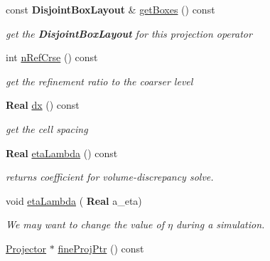 \begin{DoxyCompactItemize}
const \textbf{ Disjoint\+Box\+Layout} \& \hyperlink{class_projector_a139b4c4a107978be04259f436af16b65}{get\+Boxes} () const
\begin{DoxyCompactList}\small\item\em get the \textbf{ Disjoint\+Box\+Layout} for this projection operator \end{DoxyCompactList}\item 
\mbox{\label{class_projector_ad602a3f4c02994971e2bffd71cbb5ba0}} 
int \hyperlink{class_projector_ad602a3f4c02994971e2bffd71cbb5ba0}{n\+Ref\+Crse} () const
\begin{DoxyCompactList}\small\item\em get the refinement ratio to the coarser level \end{DoxyCompactList}\item 
\mbox{\label{class_projector_a84cae9538d1fb0cc3fca902a799d5e9d}} 
\textbf{ Real} \hyperlink{class_projector_a84cae9538d1fb0cc3fca902a799d5e9d}{dx} () const
\begin{DoxyCompactList}\small\item\em get the cell spacing \end{DoxyCompactList}\item 
\mbox{\label{class_projector_a3f98f84a909efe50397f1e58e21c3db9}} 
\textbf{ Real} \hyperlink{class_projector_a3f98f84a909efe50397f1e58e21c3db9}{eta\+Lambda} () const
\begin{DoxyCompactList}\small\item\em returns coefficient for volume-\/discrepancy solve. \end{DoxyCompactList}\item 
\mbox{\label{class_projector_ac56d963da35eaead061ee441c2667370}} 
void \hyperlink{class_projector_ac56d963da35eaead061ee441c2667370}{eta\+Lambda} (\textbf{ Real} a\+\_\+eta)
\begin{DoxyCompactList}\small\item\em We may want to change the value of $ \eta $ during a simulation. \end{DoxyCompactList}\item 
\mbox{\label{class_projector_ae65d01b87c70cca4206bd00590ad2154}} 
\hyperlink{class_projector}{Projector} $\ast$ \hyperlink{class_projector_ae65d01b87c70cca4206bd00590ad2154}{fine\+Proj\+Ptr} () const

\end{DoxyCompactItemize}

